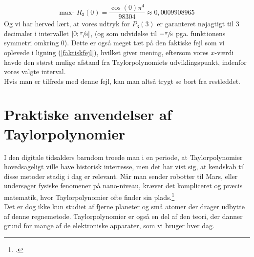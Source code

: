 \documentclass[12pt, a4paper]{article}
\begin{document}
\begin{refsection}
    \begin{equation*}
       \text{max- } R_{3}(0)=\frac{\cos(0)\pi^4}{98304}\approx 0{,}0009908965
    \end{equation*}
    Og vi har herved lært, at vores udtryk for $P_3(3)$ er garanteret nøjagtigt til 3 decimaler i intervallet $[0;\sfrac{\pi}{8}]$, (og som udvidelse til $-\sfrac{\pi}{8}$ pga. funktionens symmetri omkring 0). Dette er også meget tæt på den faktiske fejl som vi oplevede i ligning (\ref{faktiskfejl}), hvilket giver mening, eftersom vores $x$-værdi havde den størst mulige afstand fra Taylorpolynomiets udviklingspunkt, indenfor vores valgte interval.\\
Hvis man er tilfreds med denne fejl, kan man altså trygt se bort fra restleddet. 
\section{Praktiske anvendelser af Taylorpolynomier}
I den digitale tidsalders barndom troede man i en periode, at Taylorpolynomier hovedsageligt ville have historisk interresse, men det har vist sig, at kendskab til disse metoder stadig i dag er relevant. Når man sender robotter til Mars, eller undersøger fysiske fenomener på nano-niveau, kræver det kompliceret og præcis matematik, hvor Taylorpolynomier ofte finder sin plads.\footcite[s. 11]{hvadermatematik}\\
Det er dog ikke kun studiet af fjerne planeter og små atomer der drager udbytte af denne regnemetode. Taylorpolynomier er også en del af den teori, der danner grund for mange af de elektroniske apparater, som vi bruger hver dag. 

\end{refsection}
\end{document}
